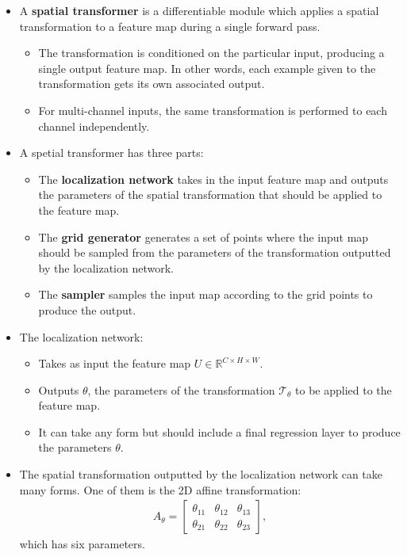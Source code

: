 \documentclass[10pt]{article}
\newcommand{\mc}[1]{\mathcal{#1}}
\newcommand{\Real}{\mathbb{R}}
\begin{document}
  \begin{itemize}
  	\item A \textbf{spatial transformer} is a differentiable module which applies a spatial transformation to a feature map during a single forward pass.
  	\begin{itemize}
  	  \item The transformation is conditioned on the particular input, producing a single output feature map. In other words, each example given to the transformation gets its own associated output.

  	  \item For multi-channel inputs, the same transformation is performed to each channel independently. 
  	\end{itemize}

  	\item A spetial transformer has three parts:
  	\begin{itemize}
  		\item The \textbf{localization network} takes in the input feature map and outputs the parameters of the spatial transformation that should be applied to the feature map.

  		\item The \textbf{grid generator} generates a set of points where the input map should be sampled from the parameters of the transformation outputted by the localization network.

  		\item The \textbf{sampler} samples the input map according to the grid points to produce the output. 
  	\end{itemize}

  	\item The localization network:
  	\begin{itemize}
  		\item Takes as input the feature map $U \in \Real^{C \times H \times W}$.
  		
  		\item Outputs $\theta$, the parameters of the transformation $\mc{T}_\theta$ to be applied to the feature map.

  		\item It can take any form but should include a final regression layer to produce the parameters $\theta$.
  	\end{itemize}

 	\item The spatial transformation outputted by the localization network can take many forms. One of them is the 2D affine transformation:
 	\begin{align*}
 		A_\theta = \begin{bmatrix}
 			\theta_{11} & \theta_{12} & \theta_{13} \\
 			\theta_{21} & \theta_{22} & \theta_{23}
 		\end{bmatrix},
 	\end{align*}
 	which has six parameters.


\end{itemize}
\end{document}
